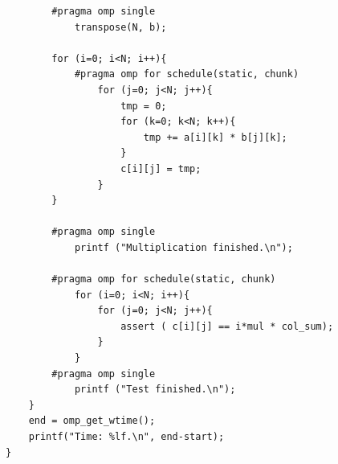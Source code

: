 \documentclass[a4paper,12pt,fleqn]{article}
\begin{document}
\begin{verbatim}
        #pragma omp single
            transpose(N, b);

        for (i=0; i<N; i++){
            #pragma omp for schedule(static, chunk)
                for (j=0; j<N; j++){
                    tmp = 0;
                    for (k=0; k<N; k++){
                        tmp += a[i][k] * b[j][k];
                    }
                    c[i][j] = tmp;
                }
        }

        #pragma omp single
            printf ("Multiplication finished.\n");         

        #pragma omp for schedule(static, chunk)
            for (i=0; i<N; i++){
              	for (j=0; j<N; j++){
                    assert ( c[i][j] == i*mul * col_sum);  
                }
            }
        #pragma omp single
            printf ("Test finished.\n");         
    }
    end = omp_get_wtime();
    printf("Time: %lf.\n", end-start);
}

\end{verbatim} 
 
\end{document}
